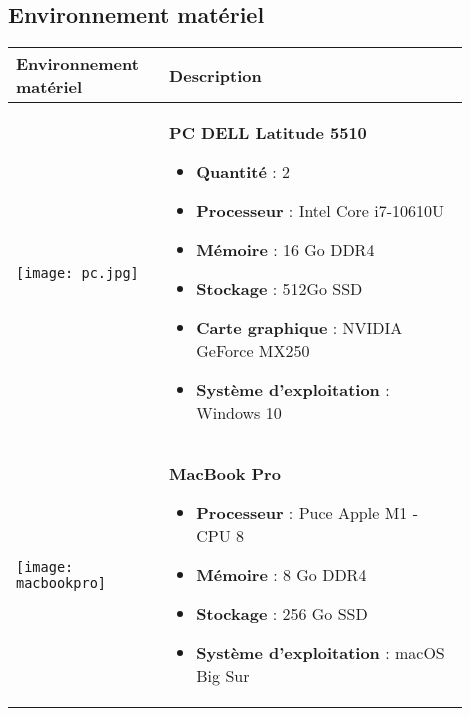 \subsection{Environnement matériel}

\begin{table}[H]
  \centering
  \begin{center}
    \begin{tabular}{|p{0.3\linewidth}|p{0.6\linewidth}|}
      \hline
      Environnement matériel & Description \\
      \hline
      
      \begin{minipage}{\linewidth}
        \texttt{[image: pc.jpg]}
      \end{minipage} &
      \begin{minipage}{\linewidth}
        \vspace{0.2cm}
        \textbf{PC DELL Latitude 5510}
        \begin{itemize}
          \item \textbf{Quantité} : 2
          \item \textbf{Processeur} : Intel Core i7-10610U 
          \item \textbf{Mémoire} : 16 Go DDR4 
          \item \textbf{Stockage} : 512Go SSD 
          \item \textbf{Carte graphique} : NVIDIA GeForce MX250 
          \item \textbf{Système d'exploitation} : Windows 10 
        \end{itemize}
        \vspace{0.2cm}
      \end{minipage} \\
      \hline
      \begin{minipage}{\linewidth}
        \texttt{[image: macbookpro]}
      \end{minipage} &
      \begin{minipage}{\linewidth}
        \vspace{0.2cm}
        \textbf{MacBook Pro}
        \begin{itemize}
          \item \textbf{Processeur} : Puce Apple M1 - CPU 8 
          \item \textbf{Mémoire} : 8 Go DDR4
          \item \textbf{Stockage} : 256 Go SSD
          \item \textbf{Système d'exploitation} : macOS Big Sur 
        \end{itemize}
        \vspace{0.2cm}
      \end{minipage} \\



\end{tabular}
\end{center}
\end{table}
